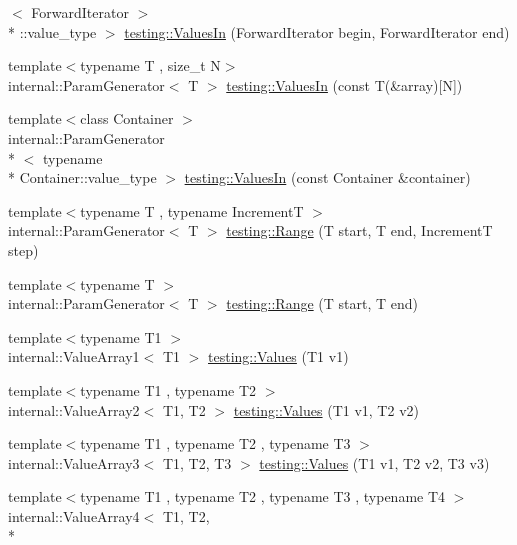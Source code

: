 \begin{DoxyCompactItemize}
$<$ Forward\-Iterator $>$\\*
\-::value\-\_\-type $>$ \hyperlink{namespacetesting_a5f8e1eb074d24671d679f6ccda6710bc}{testing\-::\-Values\-In} (Forward\-Iterator begin, Forward\-Iterator end)
\item 
{\footnotesize template$<$typename T , size\-\_\-t N$>$ }\\internal\-::\-Param\-Generator$<$ T $>$ \hyperlink{namespacetesting_affa90ba3821bd7ac15f147b1c31f9a73}{testing\-::\-Values\-In} (const T(\&array)\mbox{[}N\mbox{]})
\item 
{\footnotesize template$<$class Container $>$ }\\internal\-::\-Param\-Generator\\*
$<$ typename \\*
Container\-::value\-\_\-type $>$ \hyperlink{namespacetesting_aa67d0c8470c5f69fcfcacc9e775fa982}{testing\-::\-Values\-In} (const Container \&container)
\item 
{\footnotesize template$<$typename T , typename Increment\-T $>$ }\\internal\-::\-Param\-Generator$<$ T $>$ \hyperlink{namespacetesting_a265ed70a86cf2d6641582c45ad9529e2}{testing\-::\-Range} (T start, T end, Increment\-T step)
\item 
{\footnotesize template$<$typename T $>$ }\\internal\-::\-Param\-Generator$<$ T $>$ \hyperlink{namespacetesting_a56a45f85a1238dfc92e6fca03eb3a2e4}{testing\-::\-Range} (T start, T end)
\item 
{\footnotesize template$<$typename T1 $>$ }\\internal\-::\-Value\-Array1$<$ T1 $>$ \hyperlink{namespacetesting_a8209ef59db08b8ad4beed30d8d6e6a88}{testing\-::\-Values} (T1 v1)
\item 
{\footnotesize template$<$typename T1 , typename T2 $>$ }\\internal\-::\-Value\-Array2$<$ T1, T2 $>$ \hyperlink{namespacetesting_a7cfec131dd8773430fb87483509cc6d0}{testing\-::\-Values} (T1 v1, T2 v2)
\item 
{\footnotesize template$<$typename T1 , typename T2 , typename T3 $>$ }\\internal\-::\-Value\-Array3$<$ T1, T2, T3 $>$ \hyperlink{namespacetesting_a344ca3522cb99a7b98801a9577993011}{testing\-::\-Values} (T1 v1, T2 v2, T3 v3)
\item 
{\footnotesize template$<$typename T1 , typename T2 , typename T3 , typename T4 $>$ }\\internal\-::\-Value\-Array4$<$ T1, T2, \\*

\end{DoxyCompactItemize}
